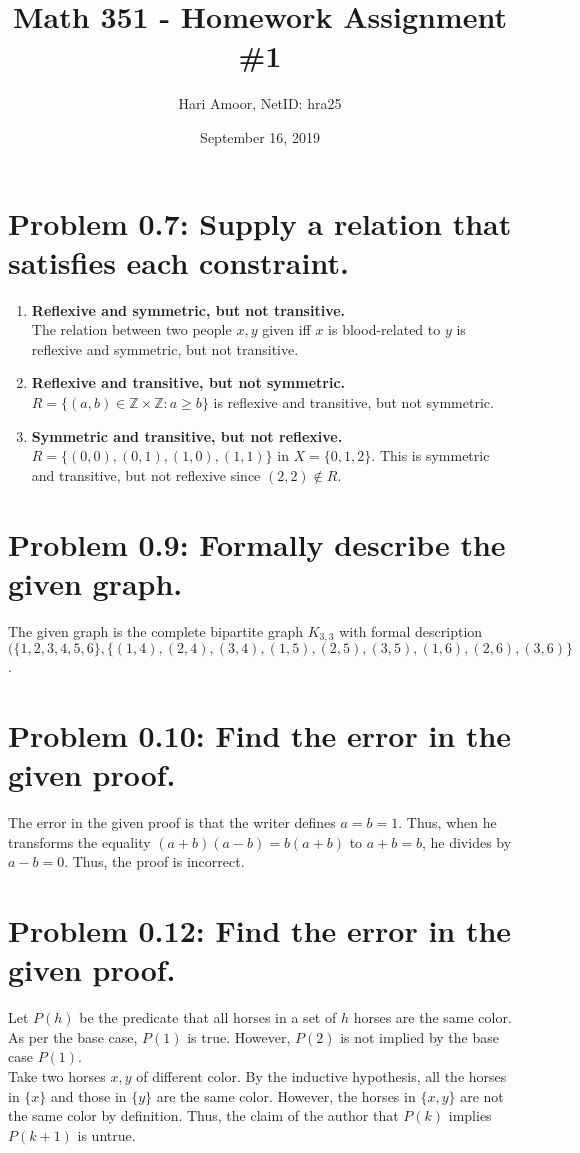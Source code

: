 \documentclass[12pt]{article}
\title{Math 351 - Homework Assignment \#1}
\author{Hari Amoor, NetID: hra25}
\date{September 16, 2019}
\begin{document}
\maketitle

\section*{Problem 0.7: Supply a relation that satisfies each constraint.}
\begin{enumerate}[label=(\alph*)]
	\item \textbf{Reflexive and symmetric, but not transitive.} \\
		\newline
		The relation between two people $x, y$ given iff $x$ is blood-related to $y$ is reflexive and symmetric, but not transitive.
	\item \textbf{Reflexive and transitive, but not symmetric.} \\
		\newline
		$R = \{(a, b) \in \mathbb{Z} \times \mathbb{Z} : a \geq b\}$ is reflexive and transitive, but not symmetric.
	\item \textbf{Symmetric and transitive, but not reflexive.} \\
		\newline
		$R = \{(0, 0), (0, 1), (1, 0), (1, 1)\}$ in $X = \{0, 1, 2\}$. This is symmetric and transitive, but not reflexive since $(2, 2) \notin R$.
\end{enumerate}

\section*{Problem 0.9: Formally describe the given graph.}
The given graph is the complete bipartite graph $K_{3, 3}$ with formal description $(\{1, 2, 3, 4, 5, 6\}, \{(1, 4), (2, 4), (3, 4), (1, 5), (2, 5), (3, 5), (1, 6), (2, 6), (3, 6)\}$.

\section*{Problem 0.10: Find the error in the given proof.}
The error in the given proof is that the writer defines $a = b = 1$. Thus, when he transforms the equality $(a + b)(a - b) = b(a + b)$ to $a + b = b$, he divides by $a - b = 0$. Thus, the proof is incorrect.

\section*{Problem 0.12: Find the error in the given proof.}
Let $P(h)$ be the predicate that all horses in a set of $h$ horses are the same color. As per the base case, $P(1)$ is true. However, $P(2)$ is not implied by the base case $P(1)$. \\
\newline
Take two horses $x, y$ of different color. By the inductive hypothesis, all the horses in $\{x\}$ and those in $\{y\}$ are the same color. However, the horses in $\{x, y\}$ are not the same color by definition. Thus, the claim of the author that $P(k)$ implies $P(k + 1)$ is untrue.
\end{document}
